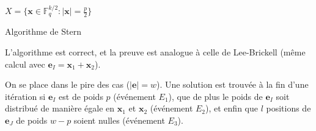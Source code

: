 \documentclass{scrartcl}[a4paper,9pt,headings=small,footinclude=false]
\theoremstyle{definition}
\theoremstyle{remark}
\begin{document}
\begin{algorithm}[H]
    \renewcommand{\algorithmcfname}{Algorithme}%
    \SetAlgoLined
    $X=\{ \textbf{x}\in\mathbb{F}_q^{k/2} :|\textbf{x}| =\frac{p}{2} \}$
    
\caption{Algorithme de Stern}
\end{algorithm}

L'algorithme est correct, et la preuve est analogue à celle de Lee-Brickell (même calcul avec $\textbf{e}_I=\textbf{x}_1+\textbf{x}_2$).

On se place dans le pire des cas ($|\textbf{e}|=w$).
Une solution est trouvée à la fin d'une itération si $\textbf{e}_I$ est de poids $p$ (événement $E_1$), que de plus le poids de $\textbf{e}_I$ soit distribué de manière égale en $\textbf{x}_1$ et $\textbf{x}_2$ (événement $E_2$), et enfin que $l$ positions de $\textbf{e}_J$ de poids $w-p$ soient nulles (événement $E_3$).
\end{document}
